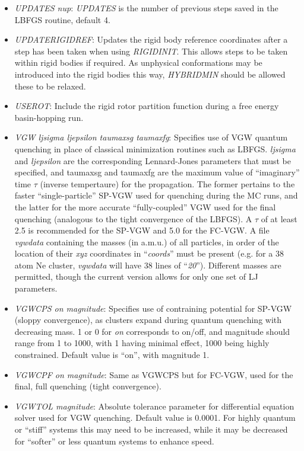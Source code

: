 \documentclass[12pt,a4paper,dvips]{article}
\begin{document}
\begin{itemize}
\item {\it UPDATES nup\/}: {\it UPDATES\/} is the number of previous steps saved in the LBFGS routine,
default 4.

\item {\it UPDATERIGIDREF\/}: Updates the rigid body reference coordinates after a step has been taken when using
{\it RIGIDINIT}. This allows steps to be taken within rigid bodies if required. As unphysical conformations may be introduced
into the rigid bodies this way, {\it HYBRIDMIN} should be allowed these to be relaxed. 

\item {\it USEROT\/}: Include the rigid rotor partition function during a free energy basin-hopping run.

\item {\it VGW ljsigma ljepsilon taumaxsg taumaxfg}: Specifies use of VGW quantum quenching in place of
classical minimization routines such as LBFGS. {\it ljsigma} and {\it ljepsilon} are the corresponding Lennard-Jones
parameters that must be specified, and taumaxsg and taumaxfg are the maximum value of ``imaginary'' time $\tau$ (inverse tempertaure) for the propagation.
The former pertains to the faster ``single-particle'' SP-VGW used for quenching during the MC runs, and the latter for the more accurate
``fully-coupled'' VGW used for the final quenching (analogous to the tight convergence of the LBFGS). A $\tau$ of at least
2.5 is recommended for the SP-VGW and 5.0 for the FC-VGW. A file {\it vgwdata} containing the masses (in a.m.u.) of all particles, in order of the location
of their {\it xyz} coordinates in ``{\it coords}'' must be present (e.g. for a 38 atom Ne cluster, {\it vgwdata} will have 38 lines of ``{\it 20}''). Different
masses are permitted, though the current version allows for only one set of LJ parameters. 

\item{\it VGWCPS on magnitude}: Specifies use of contraining potential for SP-VGW (sloppy convergence), as clusters expand during quantum quenching
with decreasing mass. 1 or 0 for {\it on} corresponds to on/off,
and magnitude should range from 1 to 1000, with 1 having minimal effect, 1000 being highly constrained. Default value is ``on'', with magnitude 1.

\item{\it VGWCPF on magnitude}: Same as VGWCPS but for FC-VGW, used for the final, full quenching (tight convergence).

\item{\it VGWTOL magnitude}: Absolute tolerance parameter for differential equation solver used for VGW quenching. Default value is 0.0001.
For highly quantum or ``stiff'' systems this may need to be increased, while it may be decreased for ``softer'' or less quantum systems to enhance
speed.
 

\end{itemize}
\end{document}

